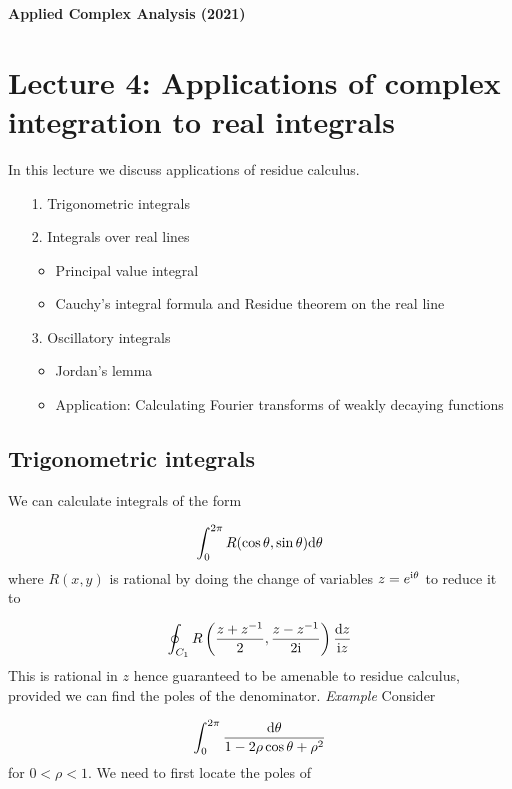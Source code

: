 \documentclass[12pt,landscape]{article}
\def\D{ {\rm d} }
\def\I{ {\rm i} }
\begin{document}
{\LARGE
\sf
\textbf{Applied Complex Analysis (2021)}

\section{Lecture 4: Applications of complex integration to real integrals}
In this lecture we discuss applications of residue calculus.

\begin{itemize}
\item[1. ] Trigonometric integrals


\item[2. ] Integrals over real lines

\begin{itemize}
\item Principal value integral


\item Cauchy's integral formula and Residue theorem on the real line

\end{itemize}

\item[3. ] Oscillatory integrals

\begin{itemize}
\item Jordan's lemma


\item Application: Calculating Fourier transforms of weakly decaying functions

\end{itemize}
\end{itemize}
\newpage
\subsection{Trigonometric integrals}
We can calculate integrals of the form

\[
\int_0^{2 \pi} R(\cos \theta, \sin \theta) \D \theta
\]
where $R(x,y)$ is rational by doing the change of variables $z = e^{\I \theta}$ to reduce it to

\[
\oint_{C_1} R\left({z + z^{-1} \over 2}, {z - z^{-1} \over 2 \I} \right) {\D z \over \I z}
\]
This is rational in $z$ hence guaranteed to be amenable to residue calculus, provided we can find the poles of the denominator.
\newpage
\emph{Example} Consider

\[
\int_0^{2\pi} {\D \theta \over 1 - 2\rho \cos \theta + \rho^2}
\]
for $0 < \rho < 1$. We need to first locate the poles of

}
\end{document}
